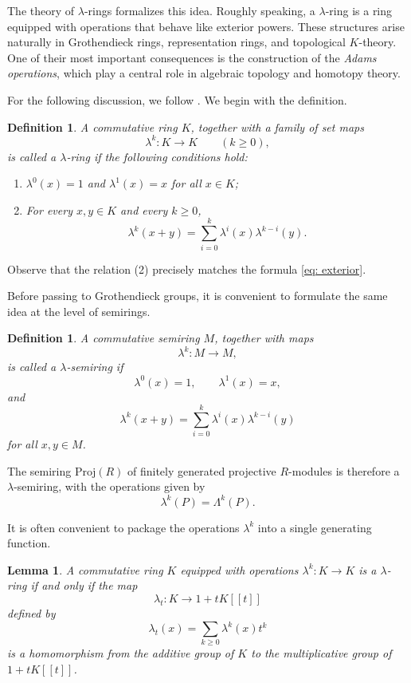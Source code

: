 \documentclass[12pt,reqno]{amsart}
\theoremstyle{plain}
\newtheorem{defn}[thm]{Definition}
\numberwithin{equation}{section}
\newtheorem{lemma}{Lemma}
\begin{document}
The theory of $\lambda$-rings formalizes this idea. Roughly speaking, a $\lambda$-ring is a ring equipped with operations that behave like exterior powers. These structures arise naturally in Grothendieck rings, representation rings, and topological $K$-theory. One of their most important consequences is the construction of the \emph{Adams operations}, which play a central role in algebraic topology and homotopy theory.

For the following discussion, we follow \cite{weibel2013kbook}. We begin with the definition.
\begin{defn}
A commutative ring $K$, together with a family of set maps
\[
\lambda^k:K\to K
\qquad (k\ge0),
\]
is called a \emph{$\lambda$-ring} if the following conditions hold:
\begin{enumerate}[label=$(\arabic*)$]
    \item $\lambda^0(x)=1$ and $\lambda^1(x)=x$ for all $x\in K$;
    
    \item For every $x,y\in K$ and every $k\ge0$,
    \[
    \lambda^k(x+y)
    =
    \sum_{i=0}^k
    \lambda^i(x)\lambda^{k-i}(y).
    \]
\end{enumerate}
\end{defn}
Observe that the relation (2) precisely matches the formula \eqref{eq: exterior}.

Before passing to Grothendieck groups, it is convenient to formulate the same idea at the level of semirings.

\begin{defn}
A commutative semiring $M$, together with maps
\[
\lambda^k:M\to M,
\]
is called a \emph{$\lambda$-semiring} if
\[
\lambda^0(x)=1,
\qquad
\lambda^1(x)=x,
\]
and
\[
\lambda^k(x+y)
=
\sum_{i=0}^k
\lambda^i(x)\lambda^{k-i}(y)
\]
for all $x,y\in M$.
\end{defn}

The semiring $\mathrm{Proj}(R)$ of finitely generated projective $R$-modules is therefore a $\lambda$-semiring, with the operations given by
\[
\lambda^k(P)=\Lambda^k(P).
\]


It is often convenient to package the operations $\lambda^k$ into a single generating function.

\begin{lemma}\label{lem: genfunc}
A commutative ring $K$ equipped with operations $\lambda^k:K\to K$ is a $\lambda$-ring if and only if the map
\[
\lambda_t:K\to 1+tK[[t]]
\]
defined by
\[
\lambda_t(x)
=
\sum_{k\ge0}\lambda^k(x)t^k
\]
is a homomorphism from the additive group of $K$ to the multiplicative group of $1+tK[[t]]$.
\end{lemma}
\end{document}
